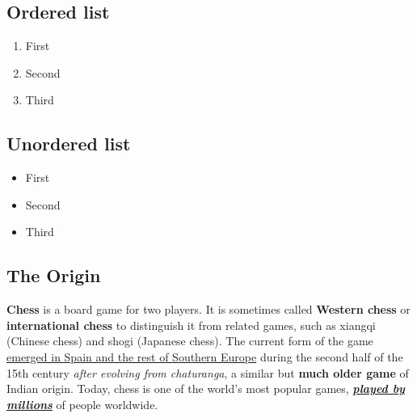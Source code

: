 \subsection{Ordered list}
\begin{enumerate}
    \item First
    \item Second
    \item Third
\end{enumerate}

\subsection{Unordered list}
\begin{itemize}
    \item First
    \item Second
    \item Third
\end{itemize}

\subsection{The Origin}
\textbf{Chess} is a board game for two players. It is sometimes called \textbf{Western chess} or \textbf{international chess} to distinguish it from related games, such as xiangqi (Chinese chess) and shogi (Japanese chess). The current form of the game \underline{emerged in Spain and the rest of Southern Europe} during the second half of the 15th century \textit{after evolving from chaturanga}, a similar but \textbf{much older game} of Indian origin. Today, chess is one of the world's most popular games, \textbf{\textit{\underline{played by millions}}} of people worldwide. 
